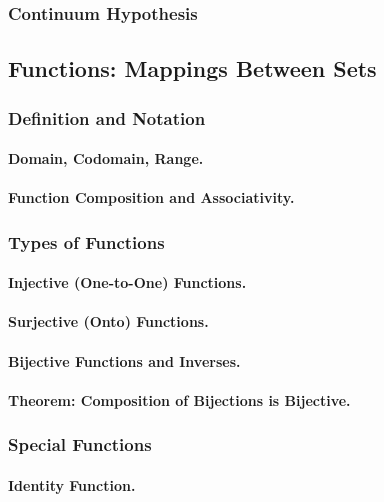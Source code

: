 \subsubsection{Continuum Hypothesis}

\subsection{Functions: Mappings Between Sets}
\label{subsec:functions}

\subsubsection{Definition and Notation}
\paragraph{Domain, Codomain, Range.}
\paragraph{Function Composition and Associativity.}

\subsubsection{Types of Functions}
\paragraph{Injective (One-to-One) Functions.}
\paragraph{Surjective (Onto) Functions.}
\paragraph{Bijective Functions and Inverses.}
\paragraph{Theorem: Composition of Bijections is Bijective.}

\subsubsection{Special Functions}
\paragraph{Identity Function.}
